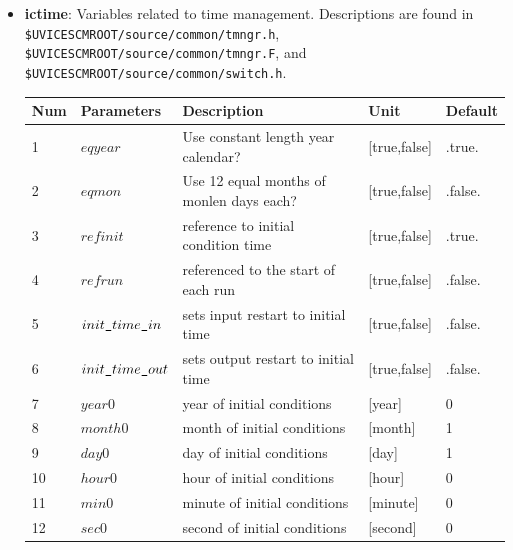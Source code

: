 \documentclass[a4paper]{article}
\begin{document}
\begin{itemize}
\item \textbf{ictime}: Variables related to time management. Descriptions are found in \\ \verb|$UVICESCMROOT/source/common/tmngr.h|, \verb|$UVICESCMROOT/source/common/tmngr.F|, and \\ \verb|$UVICESCMROOT/source/common/switch.h|. 
{\footnotesize
\begin{longtable}{lllll} \hline
  Num  & Parameters                       & Description                                   & Unit                          & Default    \\ \hline 
  1    & $eqyear$                         & Use constant length year calendar?            & [true,false]                  & .true.     \\
  2    & $eqmon$                          & Use 12 equal months of monlen days each?      & [true,false]                  & .false.    \\
  3    & $refinit$                        & reference to initial condition time           & [true,false]                  & .true.     \\
  4    & $refrun$                         & referenced to the start of each run           & [true,false]                  & .false.    \\
  5    & $init\verb|_|time\verb|_|in$     & sets input restart to initial time            & [true,false]                  & .false.    \\
  6    & $init\verb|_|time\verb|_|out$    & sets output restart to initial time           & [true,false]                  & .false.    \\
  7    & $year0$                          & year of initial conditions                    & [year]                        & 0          \\
  8    & $month0$                         & month of initial conditions                   & [month]                       & 1          \\
  9    & $day0$                           & day of initial conditions                     & [day]                         & 1          \\
  10   & $hour0$                          & hour of initial conditions                    & [hour]                        & 0          \\
  11   & $min0$                           & minute of initial conditions                  & [minute]                      & 0          \\
  12   & $sec0$                           & second of initial conditions                  & [second]                      & 0          \\ \hline 
  

\end{longtable}}
\end{itemize}
\end{document}
